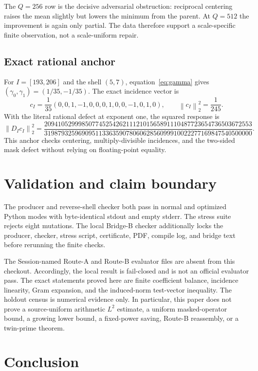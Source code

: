 \documentclass[10pt]{article}
\newcommand{\norm}[1]{\left\lVert #1\right\rVert}
\begin{document}
The $Q=256$ row is the decisive adversarial obstruction: reciprocal centering
raises the mean slightly but lowers the minimum from the parent.  At $Q=512$
the improvement is again only partial.  The data therefore support a
scale-specific finite observation, not a scale-uniform repair.

\subsection{Exact rational anchor}

For $I=[193,206]$ and the shell $(5,7)$, equation~\eqref{eq:gamma} gives
$(\gamma_0,\gamma_1)=(1/35,-1/35)$.  The exact incidence vector is
\[
 c_I=\frac1{35}(0,0,1,-1,0,0,0,1,0,0,-1,0,1,0),
 \qquad \norm{c_I}_2^2=\frac1{245}.
\]
With the literal rational defect at exponent one, the squared response is
\[
\norm{D_Ic_I}_2^2=
\frac{2094105299985077452542621112101565891110487723654736503672553}
{3198793259690951133635907806062856099910022277169847540500000}.
\]
This anchor checks centering, multiply-divisible incidences, and the two-sided
mask defect without relying on floating-point equality.

\section{Validation and claim boundary}

The producer and reverse-shell checker both pass in normal and optimized
Python modes with byte-identical stdout and empty stderr.  The stress suite
rejects eight mutations.  The local Bridge-B checker additionally locks the
producer, checker, stress script, certificate, PDF, compile log, and bridge
text before rerunning the finite checks.

The Session-named Route-A and Route-B evaluator files are absent from this
checkout.  Accordingly, the local result is fail-closed and is not an
official evaluator pass.  The exact statements proved here are finite
coefficient balance, incidence linearity, Gram expansion, and the induced-norm
test-vector inequality.  The holdout census is numerical evidence only.
In particular, this paper does not prove a source-uniform arithmetic $L^2$
estimate, a uniform masked-operator bound, a growing lower bound, a fixed-power
saving, Route-B reassembly, or a twin-prime theorem.

\section{Conclusion}
\end{document}
